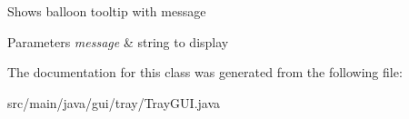 Shows balloon tooltip with message 
\begin{DoxyParams}{Parameters}
{\em message} & string to display \\
\hline
\end{DoxyParams}


The documentation for this class was generated from the following file\+:\begin{DoxyCompactItemize}
\item 
src/main/java/gui/tray/Tray\+G\+U\+I.\+java\end{DoxyCompactItemize}
